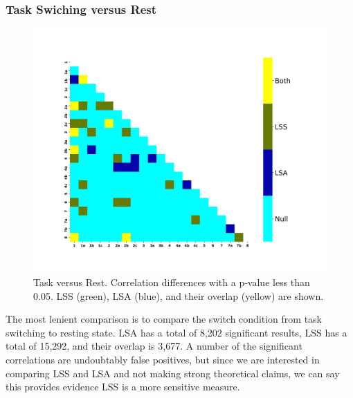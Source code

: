 \documentclass[10pt,letterpaper]{article}
\begin{document}
\subsubsection*{Task Swiching versus Rest}
\begin{figure}[H]
  \centering
  \includegraphics[width=\textwidth]{data-both_atlas-activation_contrast-taskXnull}
  \caption{
    Task versus Rest. Correlation differences with a p-value less than 0.05.
    LSS (green), LSA (blue), and their overlap (yellow) are shown.
  }
  \label{fig:taskvrest}
\end{figure}

The most lenient comparison is to compare the switch condition from task switching to resting state.
LSA has a total of 8,202 significant results, LSS has a total of 15,292,
and their overlap is 3,677.
A number of the significant correlations are undoubtably false positives, but
since we are interested in comparing LSS and LSA and not making strong theoretical claims,
we can say this provides evidence LSS is a more sensitive measure.
\end{document}
